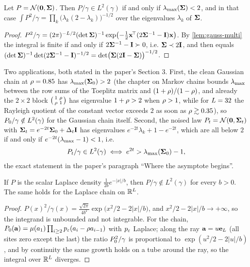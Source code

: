 \begin{proposition}
\label{prop:l2-gaussian}
Let $P=\mathcal{N}\!\left(\mathbf{0},\mathbf{\Sigma}\right)$. Then $P/\gamma\in L^2(\gamma)$ if and only if
$\lambda_{\max}(\mathbf{\Sigma})<2$, and in that case
$\int P^2/\gamma=\prod_k\bigl(\lambda_k(2-\lambda_k)\bigr)^{-1/2}$ over the eigenvalues
$\lambda_k$ of $\mathbf{\Sigma}$.
\end{proposition}
\begin{proof}
$P^2/\gamma=(2\pi)^{-L/2}(\det\mathbf{\Sigma})^{-1}\exp\bigl(-\tfrac12\mathbf{x}^{\!\top}(2\mathbf{\Sigma}^{-1}-\mathbf{I})\mathbf{x}\bigr)$.
By \cref{lem:gauss-multi} the integral is finite if and only if $2\mathbf{\Sigma}^{-1}-\mathbf{I}\succ0$,
i.e. $\mathbf{\Sigma}\prec2\mathbf{I}$, and then equals $(\det\mathbf{\Sigma})^{-1}\det(2\mathbf{\Sigma}^{-1}-\mathbf{I})^{-1/2}=\det\bigl(\mathbf{\Sigma}(2\mathbf{I}-\mathbf{\Sigma})\bigr)^{-1/2}$.
\end{proof}

Two applications, both stated in the paper's Section 3. First, the clean Gaussian
chain at $\rho=0.85$ has $\lambda_{\max}(\mathbf{\Sigma}_0)>2$ (the chapter on Markov chains bounds
$\lambda_{\max}$ between the row sums of the Toeplitz matrix and $(1+\rho)/(1-\rho)$, and
already the $2\times2$ block $\begin{psmallmatrix}1&\rho\\\rho&1\end{psmallmatrix}$ has
eigenvalue $1+\rho>2$ when $\rho>1$, while for $L=32$ the Rayleigh quotient of
the constant vector exceeds $2$ as soon as $\rho\gtrsim0.35$), so $P_0/\gamma\notin L^2(\gamma)$
for the Gaussian chain itself. Second, the noised law $P_t=\mathcal{N}\!\left(\mathbf{0},\mathbf{\Sigma}_t\right)$ with
$\mathbf{\Sigma}_t=e^{-2t}\mathbf{\Sigma}_0+\Delta_t\mathbf{I}$ has eigenvalues $e^{-2t}\lambda_k+1-e^{-2t}$, which are all
below $2$ if and only if $e^{-2t}(\lambda_{\max}-1)<1$, i.e.
\begin{equation}
  P_t/\gamma\in L^2(\gamma)\iff e^{2t}>\lambda_{\max}(\mathbf{\Sigma}_0)-1 ,
  \label{eq:l2-crossover}
\end{equation}
the exact statement in the paper's paragraph ``Where the asymptote begins''.

\begin{proposition}
\label{prop:l2-laplace}
If $P$ is the scalar Laplace density $\tfrac1{2b}e^{-|x|/b}$, then $P/\gamma\notin L^2(\gamma)$
for every $b>0$. The same holds for the Laplace chain on $\mathbb{R}^{L}$.
\end{proposition}
\begin{proof}
$P(x)^2/\gamma(x)=\tfrac{\sqrt{2\pi}}{4b^2}\exp\bigl(x^2/2-2|x|/b\bigr)$, and $x^2/2-2|x|/b\to+\infty$,
so the integrand is unbounded and not integrable. For the chain,
$P_0(\mathbf{a})=\mu(a_1)\prod_{i\ge2}p_{\varepsilon}(a_i-\rho a_{i-1})$ with $p_{\varepsilon}$ Laplace; along the
ray $\mathbf{a}=u\mathbf{e}_{L}$ (all sites zero except the last) the ratio
$P_0^2/\gamma$ is proportional to $\exp(u^2/2-2|u|/b)$, and by continuity the same
growth holds on a tube around the ray, so the integral over $\mathbb{R}^{L}$ diverges.
\end{proof}

